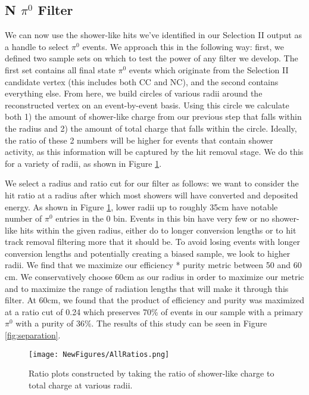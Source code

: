 \documentclass[12pt]{article}
\begin{document}
\subsection{N $\pi^0$ Filter}
We can now use the shower-like hits we've identified in our Selection II output as a handle to select $\pi^0$ events.  We approach this in the following way: first, we defined two sample sets on which to test the power of any filter we develop. The first set contains all final state $\pi^0$ events which originate from the Selection II candidate vertex (this includes both CC and NC), and the second contains everything else.  From here, we build circles of various radii around the reconstructed vertex on an event-by-event basis. Using this circle we calculate both 1) the amount of shower-like charge from our previous step that falls within the radius and 2) the amount of total charge that falls within the circle.  Ideally, the ratio of these 2 numbers will be higher for events that contain shower activity, as this information will be captured by the hit removal stage.  We do this for a variety of radii, as shown in Figure \ref{fig:all_radii}.  
\par We select a radius and ratio cut for our filter as follows:  we want to consider the hit ratio at a radius after which most showers will have converted and deposited energy.  As shown in Figure \ref{fig:all_radii}, lower radii up to roughly 35cm have notable number of $\pi^0$ entries in the 0 bin. Events in this bin have very few or no shower-like hits within the given radius, either do to longer conversion lengths or to hit track removal filtering more that it should be. To avoid losing events with longer conversion lengths and potentially creating a biased sample, we look to higher radii. We find that we maximize our efficiency * purity metric between 50 and 60 cm. We conservatively choose 60cm as our radius in order to maximize our metric and to maximize the range of radiation lengths that will make it through this filter.  At 60cm, we found that the product of efficiency and purity was maximized at a ratio cut of 0.24 which preserves 70\% of events in our sample with a primary $\pi^0$ with a purity of 36\%. The results of this study can be seen in Figure \ref{fig:separation}.

\begin{figure}[h!]
\centering
\texttt{[image: NewFigures/AllRatios.png]}
\caption{Ratio plots constructed by taking the ratio of shower-like charge to total charge at various radii. }
\label{fig:all_radii}
\end{figure}
\end{document}
